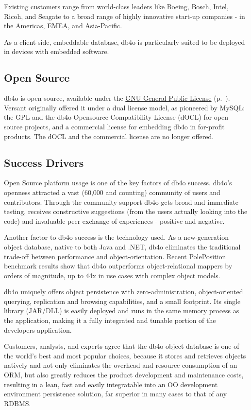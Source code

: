 Existing customers range from world-class leaders like Boeing, Bosch, Intel, Ricoh, and Seagate to a broad range of highly innovative start-up companies - in the Americas, EMEA, and Asia-Pacific.

As a client-side, embeddable database, db4o is particularly suited to be deployed in devices with embedded software.

\subsection*{Open Source}

db4o is open source, available under the \hyperref[ref:license]{GNU General Public License} (p.~\pageref{ref:license}). Versant originally offered it under a dual license model, as pioneered by MySQL: the GPL and the db4o Opensource Compatibility License (dOCL) for open source projects, and a commercial license for embedding db4o in for-profit products. The dOCL and the commercial license are no longer offered.

\subsection*{Success Drivers}

Open Source platform usage is one of the key factors of db4o success. db4o's openness attracted a vast (60,000 and counting) community of users and contributors. Through the community support db4o gets broad and immediate testing, receives constructive suggestions (from the users actually looking into the code) and invaluable peer exchange of experiences - positive and negative.

Another factor to db4o success is the technology used. As a new-generation object database, native to both Java and .NET, db4o eliminates the traditional trade-off between performance and object-orientation. Recent PolePosition benchmark results show that db4o outperforms object-relational mappers by orders of magnitude, up to 44x in use cases with complex object models.

db4o uniquely offers object persistence with zero-administration, object-oriented querying, replication and browsing capabilities, and a small footprint. Its single library (JAR/DLL) is easily deployed and runs in the same memory process as the application, making it a fully integrated and tunable portion of the developers application.

Customers, analysts, and experts agree that the db4o object database is one of the world's best and most popular choices, because it stores and retrieves objects natively and not only eliminates the overhead and resource consumption of an ORM, but also greatly reduces the product development and maintenance costs, resulting in a lean, fast and easily integratable into an OO development environment persistence solution, far superior in many cases to that of any RDBMS.

